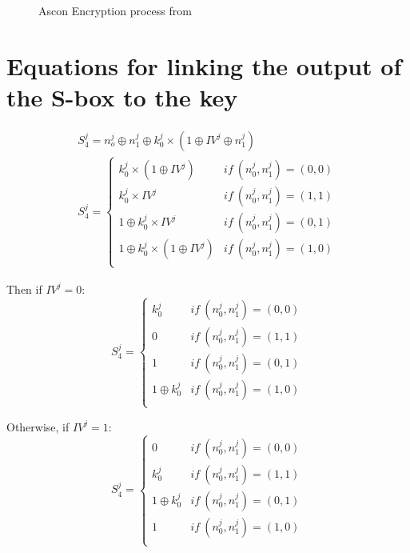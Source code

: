 \documentclass[11pt,technote]{IEEEtran}
\begin{document}
		\begin{figure}[H]
			\centering
			
			\caption{Ascon Encryption process from \cite{cours_crypto}}
			\label{fig:enc}
		\end{figure}
		
		
		\section{Equations for linking the output of the S-box to the key} \label{equations}
		\begin{gather*}
			S_4^j = n_o^j \oplus n_1^j \oplus k_0^j \times (1 \oplus IV^j \oplus n_1^j)\\
			S _4^j =\left \{	
				\begin{array}{ll}
					k_0^j \times (1 \oplus IV^j) & if\ (n_0^j,n_1^j)=(0,0)\\
					k_0^j \times IV^j & if\ (n_0^j,n_1^j)=(1,1)\\
					1 \oplus k_0^j \times IV^j & if\ (n_0^j,n_1^j)=(0,1)\\
					1 \oplus k_0^j \times (1 \oplus IV^j) & if\ (n_0^j,n_1^j)=(1,0)\\
				\end{array}
					\right.
		\end{gather*}
		 
		 \noindent Then if $IV^j = 0$: 
		 $$S _4^j =\left \{	
		 \begin{array}{ll}
		 	k_0^j& if\ (n_0^j,n_1^j)=(0,0)\\
		 	0& if\ (n_0^j,n_1^j)=(1,1)\\
		 	1& if\ (n_0^j,n_1^j)=(0,1)\\
		 	1 \oplus k_0^j& if\ (n_0^j,n_1^j)=(1,0)\\
		 \end{array}
		 \right.$$
		 
		 \noindent Otherwise, if $IV^j = 1$:
		 $$S _4^j =\left \{	
		 \begin{array}{ll}
		 	0& if\ (n_0^j,n_1^j)=(0,0)\\
		 	k_0^j& if\ (n_0^j,n_1^j)=(1,1)\\
		 	1 \oplus k_0^j& if\ (n_0^j,n_1^j)=(0,1)\\
		 	1& if\ (n_0^j,n_1^j)=(1,0)\\
		 \end{array}
		 \right.$$
		 
		 
\end{document}
